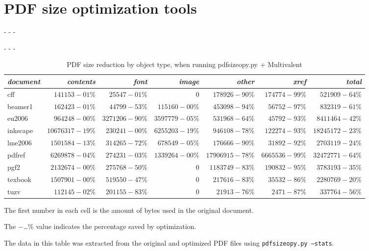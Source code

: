 \documentclass{ltugproc}
\def\cmd{\textsf}
\def\captiontop#1{%
  \advance\abovecaptionskip-\belowcaptionskip
  \advance\belowcaptionskip\abovecaptionskip
  \advance\abovecaptionskip-\belowcaptionskip
  \abovecaptionskip-\abovecaptionskip
  \caption{#1}%
  \advance\abovecaptionskip-\belowcaptionskip
  \advance\belowcaptionskip\abovecaptionskip
  \advance\abovecaptionskip-\belowcaptionskip
  \abovecaptionskip-\abovecaptionskip
}
\begin{document}
\section{PDF size optimization tools}

\begin{table*}
\captiontop{PDF size reduction by object type, when running
\cmd{pdfsizeopy.py} + Multivalent}\label{tab:psom-by-type}
\advance\tabcolsep-2pt  %
\par\small\noindent\hfil
\begin{tabular}{@{}lrrrrrr@{}}
\toprule
\emph{document} & \emph{contents} & \emph{font} & \emph{image} & \emph{other} & \emph{xref} & \emph{total} \\\midrule
cff & $141153-01$\% & $25547-01$\% & 0 & $178926-90$\% & $174774-99$\% & $521909-64$\% \\
beamer1 & $162423-01$\% & $44799-53$\% & $115160-00$\% & $453098-94$\% & $56752-97$\% & $832319-61$\% \\
eu2006 & $964248-00$\% & $3271206-90$\% & $3597779-05$\% & $531968-64$\% & $45792-93$\% & $8411464-42$\% \\
inkscape & $10676317-19$\% & $230241-00$\% & $6255203-19$\% & $946108-78$\% & $122274-93$\% & $18245172-23$\% \\
lme2006 & $1501584-13$\% & $314265-72$\% & $678549-05$\% & $176666-90$\% & $31892-92$\% & $2703119-24$\% \\
pdfref & $6269878-04$\% & $274231-03$\% & $1339264-00$\% & $17906915-78$\% & $6665536-99$\% & $32472771-64$\% \\
pgf2 & $2132674-00$\% & $275768-50$\% & 0 & $1183749-83$\% & $190832-95$\% & $3783193-35$\% \\
texbook & $1507901-00$\% & $519550-47$\% & 0 & $217616-83$\% & $35532-86$\% & $2280769-20$\% \\
tuzv & $112145-02$\% & $201155-83$\% & 0 & $21913-76$\% & $2471-87$\% & $337764-56$\% \\
\bottomrule
\end{tabular}
\par\bigskip
\par\noindent The first number in each cell is the amount of bytes used in
the original document.
\par\noindent The $-$\ldots\% value indicates the percentage saved by
optimization.
\par\noindent The data in this table was extracted from the original and
optimized PDF files using \texttt{pdfsizeopy.py --stats}.
\end{table*}
\end{document}
